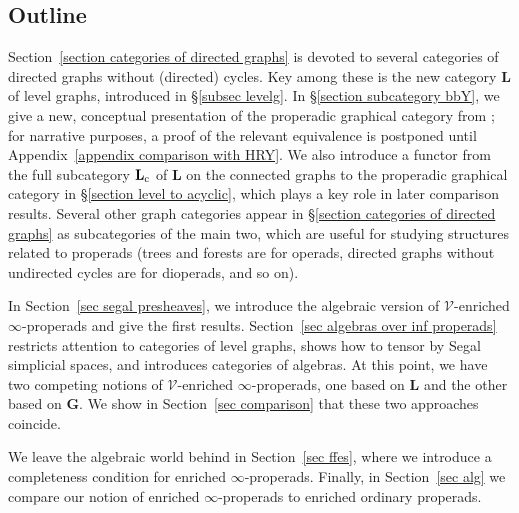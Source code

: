 \documentclass{amsart}
\numberwithin{theorem}{subsection}
\theoremstyle{definition}
\newcommand{\xV}{\mathcal{V}}
\newcommand{\name}[1]{\ensuremath{\text{\textup{#1}}}}
\newcommand{\levelg}{\mathbf{L}}
\newcommand{\levelgconn}{\levelg_{\name{c}}}
\newcommand{\bbY}{\mathbf{G}}
\begin{document}
\subsection{Outline}
Section~\ref{section categories of directed graphs} is devoted to several categories of directed graphs without (directed) cycles.
Key among these is the new category $\levelg$ of level graphs, introduced in \S\ref{subsec levelg}.
In \S\ref{section subcategory bbY}, we give a new, conceptual presentation of the properadic graphical category from \cite{hrybook}; for narrative purposes, a proof of the relevant equivalence is postponed until Appendix~\ref{appendix comparison with HRY}.
We also introduce a functor from the full subcategory $\levelgconn$ of $\levelg$ on the connected graphs to the properadic graphical category in \S\ref{section level to acyclic}, which plays a key role in later comparison results.
Several other graph categories appear in \S\ref{section categories of directed graphs} as subcategories of the main two, which are useful for studying structures related to properads (trees and forests are for operads, directed graphs without undirected cycles are for dioperads, and so on).

In Section~\ref{sec segal presheaves}, we introduce the algebraic version of $\xV$-enriched $\infty$-properads and give the first results.
Section~\ref{sec algebras over inf properads} restricts attention to categories of level graphs, shows how to tensor by Segal simplicial spaces, and introduces categories of algebras.
At this point, we have two competing notions of $\xV$-enriched $\infty$-properads, one based on $\levelg$ and the other based on $\bbY$.
We show in Section~\ref{sec comparison} that these two approaches coincide.

We leave the algebraic world behind in Section~\ref{sec ffes}, where we introduce a completeness condition for enriched $\infty$-properads.
Finally, in Section~\ref{sec alg} we compare our notion of enriched $\infty$-properads to enriched ordinary properads.
\end{document}
